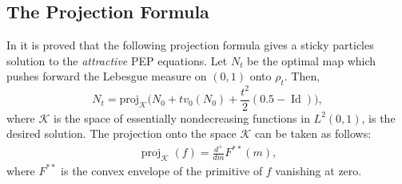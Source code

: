 \documentclass[11pt]{article}
\numberwithin{equation}{section}
\DeclareMathOperator{\proj}{proj}
\DeclareMathOperator{\Id}{Id}
\begin{document}
    \subsection{The Projection Formula}
        In \cite{BLPTW} it is proved that the following projection formula gives a sticky particles solution to the \emph{attractive} PEP equations. Let $N_t$ be the optimal map which pushes forward the Lebesgue measure on $(0,1)$ onto $\rho_t$. Then, 
        \begin{equation}\label{proj-formula}
            N_t=\text{proj}_\mathcal{K}\Big(N_0+tv_0(N_0)+\frac{t^2}{2}(0.5-\Id)\Big), 
        \end{equation}
        where $\mathcal{K}$ is the space of essentially nondecreasing functions in $L^2(0,1)$, is the desired solution. The projection onto the space $\mathcal{K}$ can be taken as follows: 
        \begin{align}
            \proj_\mathcal{K}(f)=\frac{d^+}{dm}F^{**}(m),
        \end{align}
        where $F^{**}$ is the convex envelope of the primitive of $f$ vanishing at zero.
\end{document}
